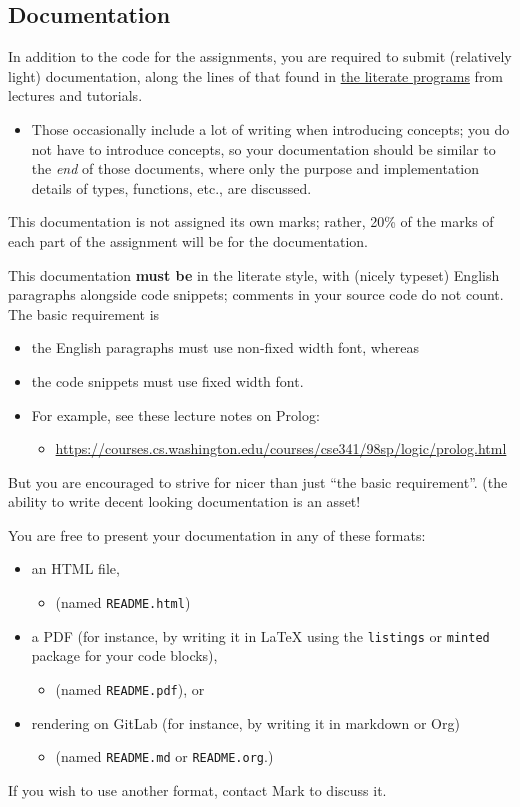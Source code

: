 \documentclass[11pt]{article}
\begin{document}
\subsection*{Documentation}
\label{sec:org84d0fae}
In addition to the code for the assignments,
you are required to submit (relatively light) documentation,
along the lines of that found in
\href{https://armkeh.github.io/principles-of-programming-languages/\#outline-container-Lecture-literate-programs}{the literate programs}
from lectures and tutorials.
\begin{itemize}
\item Those occasionally include a lot of writing when introducing concepts;
you do not have to introduce concepts, so your documentation
should be similar to the \emph{end} of those documents,
where only the purpose and implementation details
of types, functions, etc., are discussed.
\end{itemize}

This documentation is not assigned its own marks;
rather, 20\% of the marks of each part of the assignment
will be for the documentation.

This documentation \textbf{must be} in the literate style,
with (nicely typeset) English paragraphs alongside code snippets;
comments in your source code do not count.
The basic requirement is
\begin{itemize}
\item the English paragraphs must use non-fixed width font, whereas
\item the code snippets must use fixed width font.
\item For example, see these lecture notes on Prolog:
\begin{itemize}
\item \url{https://courses.cs.washington.edu/courses/cse341/98sp/logic/prolog.html}
\end{itemize}
\end{itemize}
But you are encouraged to strive for nicer than just
“the basic requirement”.
(the ability to write decent looking documentation is an asset!

You are free to present your documentation in any of these formats:
\begin{itemize}
\item an HTML file,
\begin{itemize}
\item (named \texttt{README.html})
\end{itemize}
\item a PDF (for instance, by writing it in \LaTeX{} using
the \texttt{listings} or \texttt{minted} package for your code blocks),
\begin{itemize}
\item (named \texttt{README.pdf}), or
\end{itemize}
\item rendering on GitLab (for instance, by writing it in markdown or Org)
\begin{itemize}
\item (named \texttt{README.md} or \texttt{README.org}.)
\end{itemize}
\end{itemize}
If you wish to use another format, contact Mark to discuss it.
\end{document}
